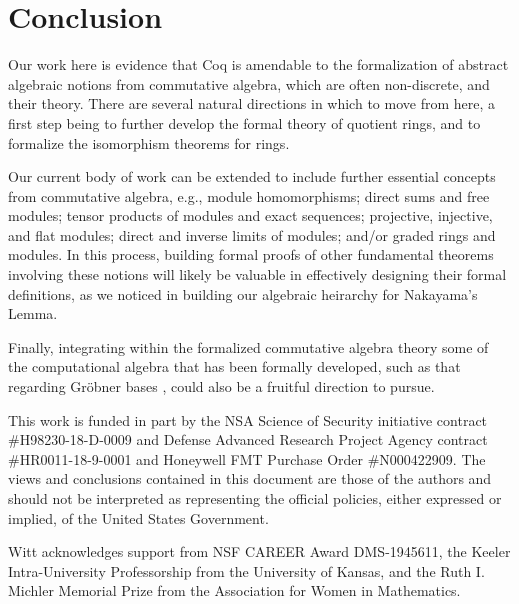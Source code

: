 \documentclass[referee,sn-mathphys]{sn-jnl}
\theoremstyle{definition}
\theoremstyle{remark}
\numberwithin{equation}{section}
\numberwithin{figure}{subsection}
\begin{document}
\section{Conclusion}
Our work here is evidence that Coq is amendable to the 
formalization of abstract algebraic notions from commutative algebra, which are often non-discrete, and their theory. 
There are several natural directions in which to move from here, a first  step being to further develop the formal theory of quotient rings, and to formalize the isomorphism theorems for rings. 

Our current body of work can be extended to include further essential concepts from commutative algebra, e.g., 
 module homomorphisms; direct sums and free modules; tensor products of modules and exact sequences; projective, injective, and flat modules; direct and inverse limits of modules; and/or graded rings and modules.
In this process, building formal proofs of other fundamental theorems involving these notions will likely be valuable in  
effectively designing their formal definitions, as we noticed in building our algebraic heirarchy for Nakayama's Lemma. 

Finally, integrating within the formalized commutative algebra theory some of the computational algebra that has been formally developed, such as that regarding Gr\"obner bases \cite{buchberger,persson2001integrated}, could also be a fruitful direction to pursue.

\backmatter
{}
This work is funded in part by the NSA Science of Security initiative contract
\#H98230-18-D-0009 and Defense Advanced Research Project Agency contract
\#HR0011-18-9-0001 and Honeywell FMT Purchase Order \#N000422909. The views and
conclusions contained in this document are those of the authors and should not
be interpreted as representing the official policies, either expressed or
implied, of the United States Government.

Witt acknowledges support from NSF CAREER Award DMS-1945611, the Keeler
Intra-University Professorship from the University of Kansas, and the Ruth I.\,
Michler Memorial Prize from the Association for Women in Mathematics.

\end{document}
